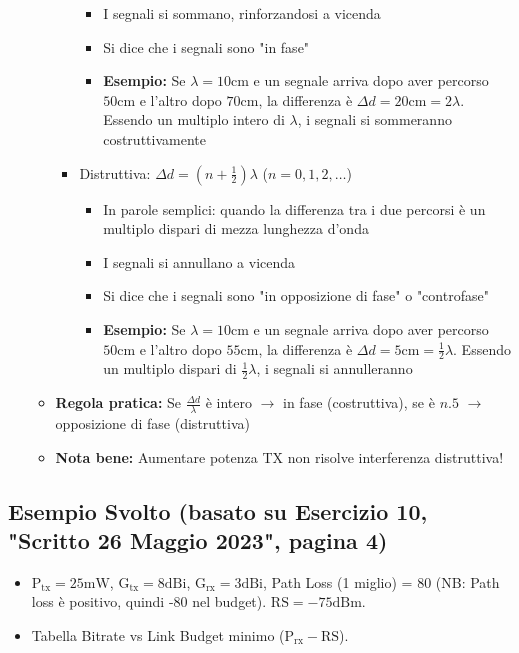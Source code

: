 \begin{itemize}
\begin{itemize}
\begin{itemize}
\begin{itemize}
                \item I segnali si sommano, rinforzandosi a vicenda
                \item Si dice che i segnali sono "in fase"
                \item \textbf{Esempio:} Se $\lambda = 10\text{cm}$ e un segnale arriva dopo aver percorso $50\text{cm}$ e l'altro dopo $70\text{cm}$, la differenza è $\Delta d = 20\text{cm} = 2\lambda$. Essendo un multiplo intero di $\lambda$, i segnali si sommeranno costruttivamente
            \end{itemize}
            \item Distruttiva: $\Delta d = (n + \frac{1}{2})\lambda$ ($n = 0,1,2,\ldots$)
            \begin{itemize}
                \item In parole semplici: quando la differenza tra i due percorsi è un multiplo dispari di mezza lunghezza d'onda
                \item I segnali si annullano a vicenda
                \item Si dice che i segnali sono "in opposizione di fase" o "controfase"
                \item \textbf{Esempio:} Se $\lambda = 10\text{cm}$ e un segnale arriva dopo aver percorso $50\text{cm}$ e l'altro dopo $55\text{cm}$, la differenza è $\Delta d = 5\text{cm} = \frac{1}{2}\lambda$. Essendo un multiplo dispari di $\frac{1}{2}\lambda$, i segnali si annulleranno
            \end{itemize}
        \end{itemize}
        \item \textbf{Regola pratica:} Se $\frac{\Delta d}{\lambda}$ è intero $\to$ in fase (costruttiva), se è $n.5$ $\to$ opposizione di fase (distruttiva)
        \item \textbf{Nota bene:} Aumentare potenza TX non risolve interferenza distruttiva!
    \end{itemize}
\end{itemize}

\subsection{Esempio Svolto (basato su Esercizio 10, "Scritto 26 Maggio 2023", pagina 4)}
\begin{itemize}
    \item $\text{P}_{\text{tx}} = 25\text{mW}$, $\text{G}_{\text{tx}} = 8\text{dBi}$, $\text{G}_{\text{rx}} = 3\text{dBi}$, Path Loss (1 miglio) = 80 (NB: Path loss è positivo, quindi -80 nel budget). $\text{RS} = -75\text{dBm}$.
    \item Tabella Bitrate vs Link Budget minimo ($\text{P}_{\text{rx}} - \text{RS}$).
\end{itemize}


